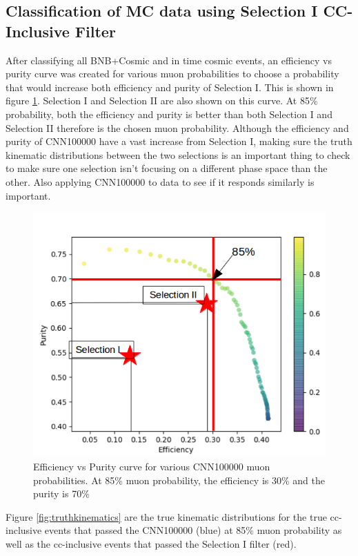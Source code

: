 \subsection{Classification of MC data using Selection I CC-Inclusive Filter}
After classifying all BNB+Cosmic and in time cosmic events, an efficiency vs purity curve was created for various muon probabilities to choose a probability that would increase both efficiency and purity of Selection I. This is shown in figure \ref{fig:roc}. Selection I and Selection II are also shown on this curve. At 85\% probability, both the efficiency and purity is better than both Selection I and Selection II therefore is the chosen muon probability. Although the efficiency and purity of CNN100000 have a vast increase from Selection I, making sure the truth kinematic distributions between the two selections is an important thing to check to make sure one selection isn't focusing on a different phase space than the other. Also applying CNN100000 to data to see if it responds similarly is important. 

\begin{figure}[htp!]
\centering
\includegraphics[width=.5\textwidth]{figs/roc_cnn_selI&II.png}
\caption{Efficiency vs Purity curve for various CNN100000 muon probabilities. At 85\% muon probability, the efficiency is 30\% and the purity is 70\%} 
\label{fig:roc}
\end{figure}

Figure \ref{fig:truthkinematics} are the true kinematic distributions for the true cc-inclusive events that passed the CNN100000 (blue) at 85\% muon probability as well as the cc-inclusive events that passed the Selection I filter (red).  

